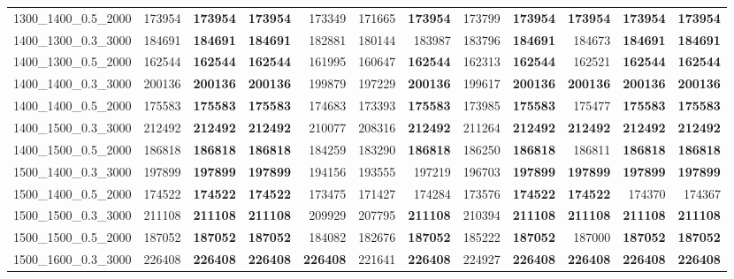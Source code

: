 \begin{landscape}
\begin{longtable}{lrrrrrrrrrrr}
1300\_1400\_0.5\_2000 & 173954 & \textbf{173954} & \textbf{173954} & 173349 & 171665 & \textbf{173954} & 173799 & \textbf{173954} & \textbf{173954} & \textbf{173954} & \textbf{173954}\\
1400\_1300\_0.3\_3000 & 184691 & \textbf{184691} & \textbf{184691} & 182881 & 180144 & 183987 & 183796 & \textbf{184691} & 184673 & \textbf{184691} & \textbf{184691}\\
1400\_1300\_0.5\_2000 & 162544 & \textbf{162544} & \textbf{162544} & 161995 & 160647 & \textbf{162544} & 162313 & \textbf{162544} & 162521 & \textbf{162544} & \textbf{162544}\\
1400\_1400\_0.3\_3000 & 200136 & \textbf{200136} & \textbf{200136} & 199879 & 197229 & \textbf{200136} & 199617 & \textbf{200136} & \textbf{200136} & \textbf{200136} & \textbf{200136}\\
1400\_1400\_0.5\_2000 & 175583 & \textbf{175583} & \textbf{175583} & 174683 & 173393 & \textbf{175583} & 173985 & \textbf{175583} & 175477 & \textbf{175583} & \textbf{175583}\\
1400\_1500\_0.3\_3000 & 212492 & \textbf{212492} & \textbf{212492} & 210077 & 208316 & \textbf{212492} & 211264 & \textbf{212492} & \textbf{212492} & \textbf{212492} & \textbf{212492}\\
1400\_1500\_0.5\_2000 & 186818 & \textbf{186818} & \textbf{186818} & 184259 & 183290 & \textbf{186818} & 186250 & \textbf{186818} & 186811 & \textbf{186818} & \textbf{186818}\\
1500\_1400\_0.3\_3000 & 197899 & \textbf{197899} & \textbf{197899} & 194156 & 193555 & 197219 & 196703 & \textbf{197899} & \textbf{197899} & \textbf{197899} & \textbf{197899}\\
1500\_1400\_0.5\_2000 & 174522 & \textbf{174522} & \textbf{174522} & 173475 & 171427 & 174284 & 173576 & \textbf{174522} & \textbf{174522} & 174370 & 174367\\
1500\_1500\_0.3\_3000 & 211108 & \textbf{211108} & \textbf{211108} & 209929 & 207795 & \textbf{211108} & 210394 & \textbf{211108} & \textbf{211108} & \textbf{211108} & \textbf{211108}\\
1500\_1500\_0.5\_2000 & 187052 & \textbf{187052} & \textbf{187052} & 184082 & 182676 & \textbf{187052} & 185222 & \textbf{187052} & 187000 & \textbf{187052} & \textbf{187052}\\
1500\_1600\_0.3\_3000 & 226408 & \textbf{226408} & \textbf{226408} & \textbf{226408} & 221641 & \textbf{226408} & 224927 & \textbf{226408} & \textbf{226408} & \textbf{226408} & \textbf{226408}\\

\end{longtable}
\end{landscape}
